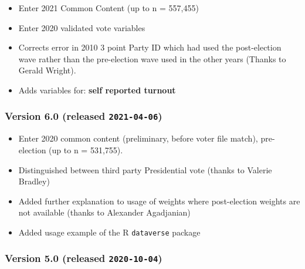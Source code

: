 \documentclass[10pt,article,oneside]{memoir}
\begin{document}
\begin{itemize}
\tightlist
\item
  Enter 2021 Common Content (up to n = 557,455)
\item
  Enter 2020 validated vote variables
\item
  Corrects error in 2010 3 point Party ID which had used the
  post-election wave rather than the pre-election wave used in the other
  years (Thanks to Gerald Wright).
\item
  Adds variables for: \textbf{self reported turnout}
\end{itemize}

\subsubsection{\texorpdfstring{Version 6.0 (released
\texttt{2021-04-06})}{Version 6.0 (released 2021-04-06)}}\label{version-6.0-released-2021-04-06}

\begin{itemize}
\tightlist
\item
  Enter 2020 common content (preliminary, before voter file match),
  pre-election (up to n = 531,755).
\item
  Distinguished between third party Presidential vote (thanks to Valerie
  Bradley)
\item
  Added further explanation to usage of weights where post-election
  weights are not available (thanks to Alexander Agadjanian)
\item
  Added usage example of the R \texttt{dataverse} package
\end{itemize}

\subsubsection{\texorpdfstring{Version 5.0 (released
\texttt{2020-10-04})}{Version 5.0 (released 2020-10-04)}}\label{version-5.0-released-2020-10-04}
\end{document}
